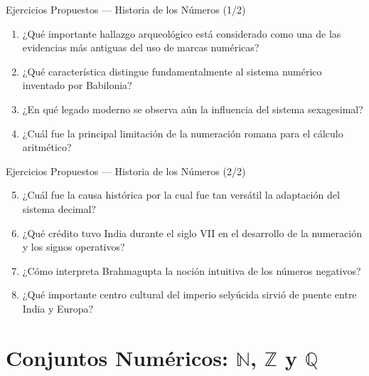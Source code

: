 \documentclass[aspectratio=169]{beamer}
\begin{document}
\begin{frame}{Ejercicios Propuestos — Historia de los Números \textnormal{(1/2)}}
  \begin{mwejercicio}
    \begin{enumerate}
      \item ¿Qué importante hallazgo arqueológico está considerado
            como una de las evidencias más antiguas del uso de marcas
            numéricas?
      \item ¿Qué característica distingue fundamentalmente al sistema
            numérico inventado por Babilonia?
      \item ¿En qué legado moderno se observa aún la influencia del
            sistema sexagesimal?
      \item ¿Cuál fue la principal limitación de la numeración romana
            para el cálculo aritmético?
    \end{enumerate}
  \end{mwejercicio}
\end{frame}

\begin{frame}{Ejercicios Propuestos — Historia de los Números \textnormal{(2/2)}}
  \begin{mwejercicio}
    \begin{enumerate}
      \setcounter{enumi}{4}
      \item ¿Cuál fue la causa histórica por la cual fue tan versátil
            la adaptación del sistema decimal?
      \item ¿Qué crédito tuvo India durante el siglo VII en el
            desarrollo de la numeración y los signos operativos?
      \item ¿Cómo interpreta Brahmagupta la noción intuitiva de los
            números negativos?
      \item ¿Qué importante centro cultural del imperio selyúcida
            sirvió de puente entre India y Europa?
    \end{enumerate}
  \end{mwejercicio}
\end{frame}

\section{Conjuntos Numéricos: \texorpdfstring{$\mathbb{N}$}{N},
  \texorpdfstring{$\mathbb{Z}$}{Z} y \texorpdfstring{$\mathbb{Q}$}{Q}}
\end{document}
